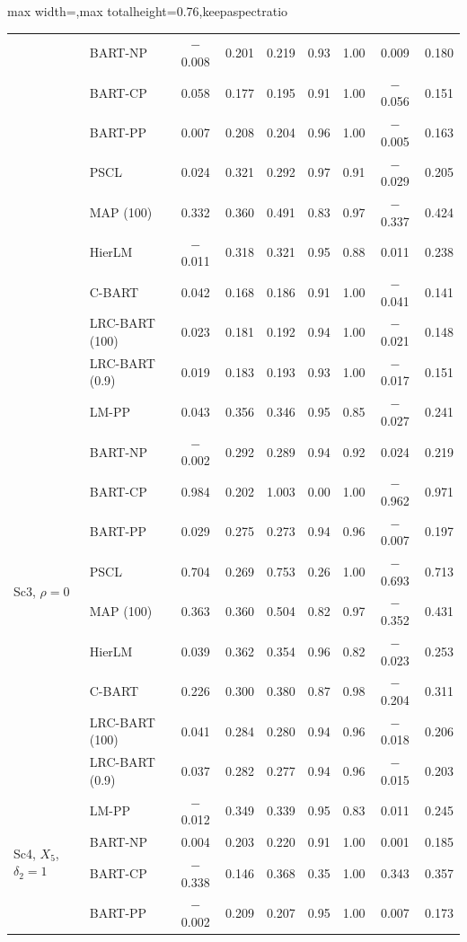 \documentclass[11pt]{article}
\theoremstyle{definition}
\theoremstyle{plain}
\begin{document}
{\begin{table}[htbp]
\begin{adjustbox}{max width=\textwidth,max totalheight=0.76\textheight,keepaspectratio}
\begin{tabular}{llccccccc}
& BART-NP & $-$0.008 & 0.201 & 0.219 & 0.93 & 1.00 & 0.009 & 0.180 \\
& BART-CP & 0.058 & 0.177 & 0.195 & 0.91 & 1.00 & $-$0.056 & 0.151 \\
& BART-PP & 0.007 & 0.208 & 0.204 & 0.96 & 1.00 & $-$0.005 & 0.163 \\
& PSCL & 0.024 & 0.321 & 0.292 & 0.97 & 0.91 & $-$0.029 & 0.205 \\
& MAP (100) & 0.332 & 0.360 & 0.491 & 0.83 & 0.97 & $-$0.337 & 0.424 \\
& HierLM & $-$0.011 & 0.318 & 0.321 & 0.95 & 0.88 & 0.011 & 0.238 \\
& C-BART & 0.042 & 0.168 & 0.186 & 0.91 & 1.00 & $-$0.041 & 0.141 \\
& LRC-BART (100) & 0.023 & 0.181 & 0.192 & 0.94 & 1.00 & $-$0.021 & 0.148 \\
& LRC-BART (0.9) & 0.019 & 0.183 & 0.193 & 0.93 & 1.00 & $-$0.017 & 0.151 \\
\midrule
\multirow{10}{*}{Sc3, $\rho=0$} & LM-PP & 0.043 & 0.356 & 0.346 & 0.95 & 0.85 & $-$0.027 & 0.241 \\
& BART-NP & $-$0.002 & 0.292 & 0.289 & 0.94 & 0.92 & 0.024 & 0.219 \\
& BART-CP & 0.984 & 0.202 & 1.003 & 0.00 & 1.00 & $-$0.962 & 0.971 \\
& BART-PP & 0.029 & 0.275 & 0.273 & 0.94 & 0.96 & $-$0.007 & 0.197 \\
& PSCL & 0.704 & 0.269 & 0.753 & 0.26 & 1.00 & $-$0.693 & 0.713 \\
& MAP (100) & 0.363 & 0.360 & 0.504 & 0.82 & 0.97 & $-$0.352 & 0.431 \\
& HierLM & 0.039 & 0.362 & 0.354 & 0.96 & 0.82 & $-$0.023 & 0.253 \\
& C-BART & 0.226 & 0.300 & 0.380 & 0.87 & 0.98 & $-$0.204 & 0.311 \\
& LRC-BART (100) & 0.041 & 0.284 & 0.280 & 0.94 & 0.96 & $-$0.018 & 0.206 \\
& LRC-BART (0.9) & 0.037 & 0.282 & 0.277 & 0.94 & 0.96 & $-$0.015 & 0.203 \\
\midrule
\multirow{10}{*}{Sc4, $X_5$, $\delta_2=1$} & LM-PP & $-$0.012 & 0.349 & 0.339 & 0.95 & 0.83 & 0.011 & 0.245 \\
& BART-NP & 0.004 & 0.203 & 0.220 & 0.91 & 1.00 & 0.001 & 0.185 \\
& BART-CP & $-$0.338 & 0.146 & 0.368 & 0.35 & 1.00 & 0.343 & 0.357 \\
& BART-PP & $-$0.002 & 0.209 & 0.207 & 0.95 & 1.00 & 0.007 & 0.173 \\

\end{tabular}
\end{adjustbox}
\end{table}}
\end{document}
